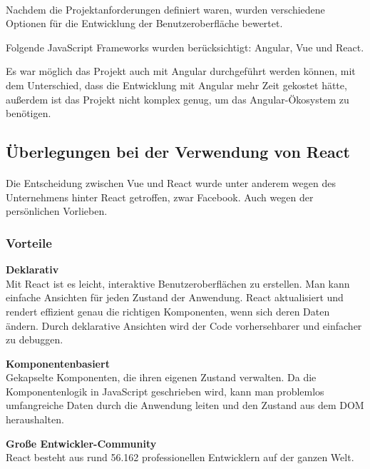 \paragraph{}

Nachdem die Projektanforderungen definiert waren, wurden verschiedene Optionen für die Entwicklung der Benutzeroberfläche bewertet.

Folgende JavaScript Frameworks wurden berücksichtigt: Angular, Vue und React.

Es war möglich das Projekt auch mit Angular durchgeführt werden können, mit dem Unterschied, dass die Entwicklung mit Angular mehr Zeit gekostet hätte, außerdem ist das Projekt nicht komplex genug, um das Angular-Ökosystem zu benötigen.

\subsection{Überlegungen bei der Verwendung von React}
\paragraph{}
Die Entscheidung zwischen Vue und React wurde unter anderem wegen des Unternehmens hinter React getroffen, zwar Facebook. Auch wegen der persönlichen Vorlieben.
\newline
\subsubsection{Vorteile} 
\textbf{Deklarativ} \\
Mit React ist es leicht, interaktive Benutzeroberflächen zu erstellen. Man kann einfache Ansichten für jeden Zustand der Anwendung. React aktualisiert und rendert effizient genau die richtigen Komponenten, wenn sich deren Daten ändern.
Durch deklarative Ansichten wird der Code vorhersehbarer und einfacher zu debuggen.
\newline

\textbf{Komponentenbasiert}\\
Gekapselte Komponenten, die ihren eigenen Zustand verwalten.
Da die Komponentenlogik in JavaScript geschrieben wird, kann man problemlos umfangreiche Daten durch die Anwendung leiten und den Zustand aus dem DOM heraushalten.
\newline

\textbf{Große Entwickler-Community}\\
React besteht aus rund 56.162 professionellen Entwicklern auf der ganzen Welt.

